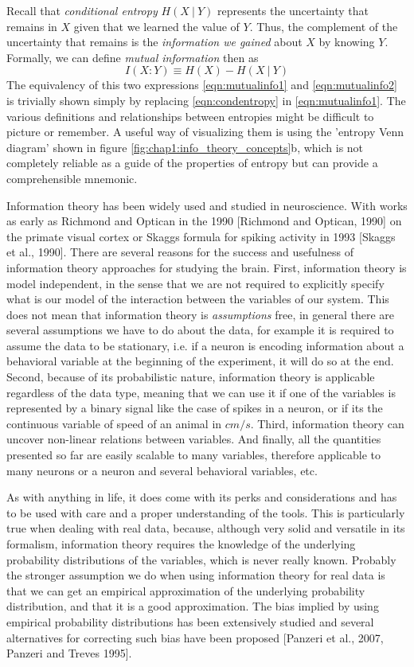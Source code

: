 Recall that \textit{conditional entropy} $H(X\ |\ Y)$ represents the uncertainty that remains in $X$ given that we learned the value of $Y$.
Thus, the complement of the uncertainty that remains is the \textit{information we gained} about $X$ by knowing $Y$. Formally, we can define \textit{mutual information} then as 
\begin{equation}
\label{eqn:mutualinfo2}
    I(X:Y)\equiv H(X) - H(X\ |\ Y)
\end{equation}
The equivalency of this two expressions \ref{eqn:mutualinfo1} and \ref{eqn:mutualinfo2}
is trivially shown simply by replacing \ref{eqn:condentropy} in \ref{eqn:mutualinfo1}.
The various definitions and relationships between entropies might be difficult to picture or remember. 
A useful way of visualizing them is using the 'entropy Venn diagram' shown in figure \ref{fig:chap1:info_theory_concepts}b, which is not completely reliable as a guide of the properties of entropy but can provide a comprehensible mnemonic. 

Information theory has been widely used and studied in neuroscience.
With works as early as Richmond and Optican in the 1990 [Richmond and Optican, 1990] on the primate visual cortex or Skaggs formula for spiking activity in 1993 [Skaggs et al., 1990].
There are several reasons for the success and usefulness of information theory approaches for studying the brain.
First, information theory is model independent, in the sense that we are not required to explicitly specify what is our model of the interaction between the variables of our system.
This does not mean that information theory is \textit{assumptions} free, in general there are several assumptions we have to do about the data, for example it is required to assume the data to be stationary, i.e. if a neuron is encoding information about a behavioral variable at the beginning of the experiment, it will do so at the end.     
Second, because of its probabilistic nature, information theory is applicable regardless of the data type, meaning that we can use it if one of the variables is represented by a binary signal like the case of spikes in a neuron, or if its the continuous variable of speed of an animal in $cm/s$.
Third, information theory can uncover non-linear relations between variables.
And finally, all the quantities presented so far are easily scalable to many variables, therefore applicable to many neurons or a neuron and several behavioral variables, etc.

As with anything in life, it does come with its perks and considerations and has to be used with care and a proper understanding of the tools.
This is particularly true when dealing with real data, because, although very solid and versatile in its formalism, information theory requires the knowledge of the underlying probability distributions of the variables, which is never really known. 
Probably the stronger assumption we do when using information theory for real data is that we can get an empirical approximation of the underlying probability distribution, and that it is a good approximation. 
The bias implied by using empirical probability distributions has been extensively studied and several alternatives for correcting such bias have been proposed [Panzeri et al., 2007, Panzeri and Treves 1995].

